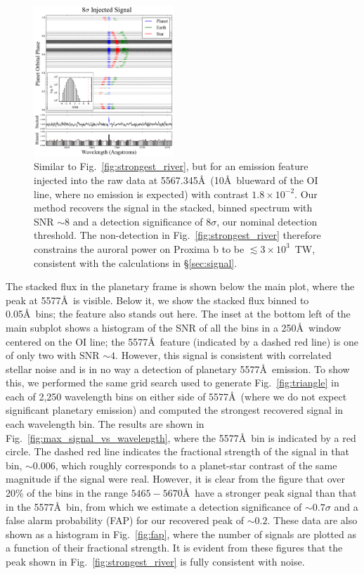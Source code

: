 \documentclass{emulateapj}
\begin{document}
\begin{figure}[bt]
\includegraphics[width=0.47\textwidth]{5577_injection_river.pdf}
\caption{Similar to Fig.~\ref{fig:strongest_river}, but for an emission feature injected into the raw data at 5567.345\AA\ (10\AA\ blueward of the OI line, where no emission is expected) with contrast $1.8\times 10^{-2}$. Our method recovers the signal in the stacked, binned spectrum with SNR ${\sim} 8$ and a detection significance of $8\sigma$, our nominal detection threshold. The non-detection in Fig.~\ref{fig:strongest_river} therefore constrains the auroral power on Proxima b to be $\lesssim 3\times 10^{3}$~TW, consistent with the calculations in \S\ref{sec:signal}.\\[0in]}
\label{fig:injection_river}
\end{figure}

The stacked flux in the planetary frame is shown below the main plot, where the peak at 5577\AA\ is visible. Below it, we show the stacked flux binned to 0.05\AA\ bins; the feature also stands out here. The inset at the bottom left of the main subplot shows a histogram of the SNR of all the bins in a 250\AA\ window centered on the OI line; the 5577\AA\ feature (indicated by a dashed red line) is one of only two with SNR ${\sim} 4$. However, this signal is consistent with correlated stellar noise and is in no way a detection of planetary 5577\AA\ emission. To show this, we performed the same grid search used to generate Fig.~\ref{fig:triangle} in each of 2,250 wavelength bins on either side of 5577\AA\ (where we do not expect significant planetary emission) and computed the strongest recovered signal in each wavelength bin. The results are shown in Fig.~\ref{fig:max_signal_vs_wavelength}, where the 5577\AA\ bin is indicated by a red circle. The dashed red line indicates the fractional strength of the signal in that bin, ${\sim} 0.006$, which roughly corresponds to a planet-star contrast of the same magnitude if the signal were real. However, it is clear from the figure that over 20\% of the bins in the range $5465-5670$\AA\ have a stronger peak signal than that in the 5577\AA\ bin, from which we estimate a detection significance of ${\sim} 0.7\sigma$ and a false alarm probability (FAP) for our recovered peak of ${\sim} 0.2$. These data are also shown as a histogram in Fig.~\ref{fig:fap}, where the number of signals are plotted as a function of their fractional strength. It is evident from these figures that the peak shown in Fig.~\ref{fig:strongest_river} is fully consistent with noise.
\end{document}
